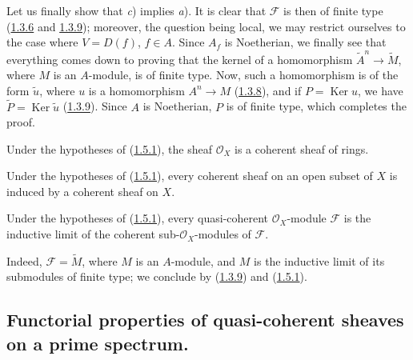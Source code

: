 Let us finally show that \textit{c}) implies \textit{a}). It is clear that
$\mathscr{F}$ is then of finite type
(\hyperref[I.1.3.6]{1.3.6} and \hyperref[I.1.3.9]{1.3.9}); moreover,
the question being local, we may restrict ourselves to the case where
$V=D(f)$, $f\in A$. Since $A_f$ is Noetherian, we finally see that
everything comes down to proving that the kernel of a homomorphism
$\widetilde{A}^n\to\widetilde{M}$, where $M$ is an $A$-module, is of finite
type. Now, such a homomorphism is of the form $\widetilde{u}$, where $u$ is
a homomorphism $A^n\to M$ (\hyperref[I.1.3.8]{1.3.8}), and if
$P=\operatorname{Ker}u$, we have
$\widetilde{P}=\operatorname{Ker}\widetilde{u}$
(\hyperref[I.1.3.9]{1.3.9}). Since $A$ is Noetherian, $P$ is of finite
type, which completes the proof.

\begin{corollary}[1.5.2]
\label{I.1.5.2}
Under the hypotheses of \textup{(\hyperref[I.1.5.1]{1.5.1})}, the sheaf
$\mathscr{O}_X$ is a coherent sheaf of rings.
\end{corollary}

\begin{corollary}[1.5.3]
\label{I.1.5.3}
Under the hypotheses of \textup{(\hyperref[I.1.5.1]{1.5.1})}, every coherent
sheaf on an open subset of $X$ is induced by a coherent sheaf on $X$.
\end{corollary}

\begin{corollary}[1.5.4]
\label{I.1.5.4}
Under the hypotheses of \textup{(\hyperref[I.1.5.1]{1.5.1})}, every
quasi-coherent $\mathscr{O}_X$-module $\mathscr{F}$ is the inductive limit
of the coherent sub-$\mathscr{O}_X$-modules of $\mathscr{F}$.
\end{corollary}

Indeed, $\mathscr{F}=\widetilde{M}$, where $M$ is an $A$-module, and $M$ is
the inductive limit of its submodules of finite type; we conclude by
(\hyperref[I.1.3.9]{1.3.9}) and
(\hyperref[I.1.5.1]{1.5.1}).

\subsection{Functorial properties of quasi-coherent sheaves on a prime
spectrum.}
\label{subsection:I.1.6}

